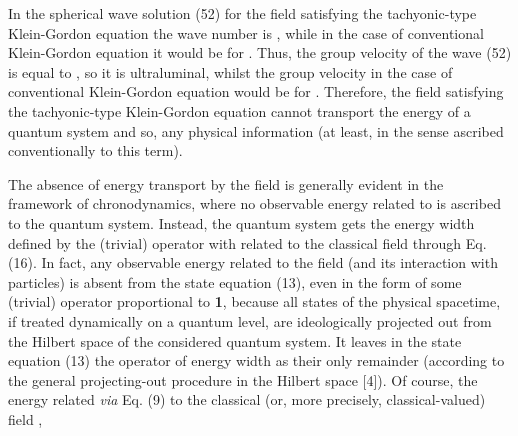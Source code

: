 \documentclass[a4paper,12pt]{article}
\begin{document}
In the spherical wave solution (52) for the field \coordHE{} satisfying the tachyonic-type Klein-Gordon equation the wave number is \coordHE{}, while in the case of conventional Klein-Gordon equation it would be \coordHE{} for \coordHE{}. Thus, the group velocity of the wave (52) is equal to \coordHE{}, so it is ultraluminal, whilst the group velocity in the case of conventional Klein-Gordon equation would be \coordHE{} for \coordHE{}. Therefore, the field \coordHE{} satisfying the tachyonic-type Klein-Gordon equation cannot transport the energy of a quantum system and so, any physical information (at least, in the sense ascribed conventionally to this term).

\vspace{0.2cm}


\vspace{0.2cm}

The absence of energy transport by the field \coordHE{} is generally evident in the framework of chronodynamics, where no observable energy related to \coordHE{} is ascribed to the quantum system. Instead, the quantum system gets the energy width defined by the (trivial) operator \coordHE{} with \coordHE{} related to the classical field \coordHE{} through Eq. (16). In fact, any observable energy related to the field \coordHE{} (and its interaction with particles) is absent from the state equation (13), even in the form of some (trivial) operator proportional to {\bf 1}, because all states of the physical spacetime, if treated dynamically on a quantum level, are ideologically projected out from the Hilbert space of the considered quantum system. It leaves in the state equation (13) the operator of energy width as their only remainder (according to the general projecting-out procedure in the Hilbert space [4]). Of course, the energy related {\it via} Eq. (9) to the classical (or, more precisely, classical-valued) field \coordHE{},
\end{document}
